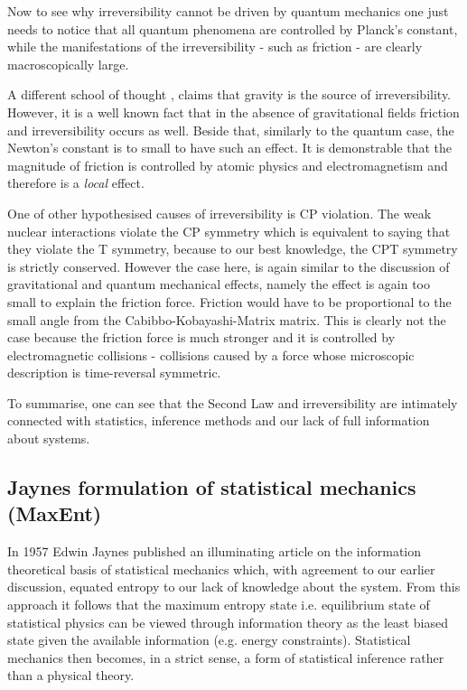 \documentclass[a4paper,12pt]{article}
\begin{document}
Now to see why irreversibility cannot be driven by quantum mechanics one just needs to notice that all quantum phenomena are controlled by Planck's constant, while the manifestations of the irreversibility - such as friction - are clearly macroscopically large. %

A different school of thought \cite{KIEFER2005, Barbour:2014hq}, %
claims that gravity is the source of irreversibility. However, it is a well known fact that in the absence of gravitational fields friction and irreversibility occurs as well. Beside that, similarly to the quantum case, the Newton's constant is to small to have such an effect. It is demonstrable that the magnitude of friction is controlled by atomic physics and electromagnetism and therefore is a \textit{local} effect. 

One of other hypothesised causes of irreversibility is CP violation. 
The weak nuclear interactions violate the CP symmetry which is equivalent to saying that they violate the T symmetry, because to our best knowledge, the CPT symmetry is strictly conserved. However the case here, is again similar to the discussion of gravitational and quantum mechanical effects, namely the effect is again too small to explain the friction force. Friction would have to be proportional to the small angle from the Cabibbo-Kobayashi-Matrix matrix.
This is clearly not the case because the friction force is much stronger and it is controlled by electromagnetic collisions - collisions caused by a force whose microscopic description is time-reversal symmetric.
 
To summarise, one can see that the Second Law and irreversibility are intimately connected with statistics, inference methods and our lack of full information about systems.

\subsection{Jaynes formulation of statistical mechanics (MaxEnt)}

In 1957 Edwin Jaynes published an illuminating article on the information theoretical basis of statistical mechanics which, with agreement to our earlier discussion, equated entropy to our lack of knowledge about the system. From this approach it follows that the maximum entropy state i.e. equilibrium state of statistical physics can be viewed through information theory as the least biased state given the available information (e.g. energy constraints).
Statistical mechanics then becomes, in a strict sense, a form of statistical inference rather than a physical theory.
\end{document}
